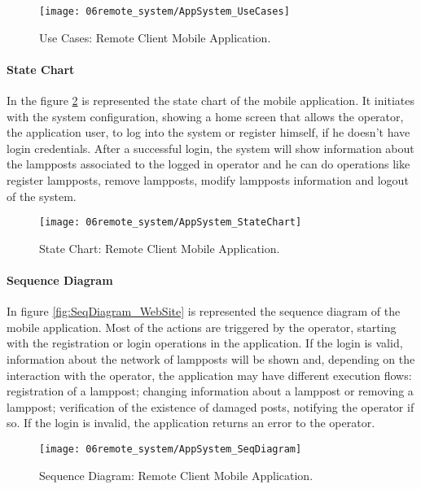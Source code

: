 \begin{figure}[H]
	\centering
	\texttt{[image: 06remote\_system/AppSystem\_UseCases]}
	\caption{Use Cases: Remote Client Mobile Application.}
	\label{fig:UseCases_application}
\end{figure}

\paragraph*{State Chart}
In the figure \ref{fig:StateChart_application} is represented the state chart of the mobile application. It initiates with the system configuration, showing a home screen that allows the operator, the application user, to log into the system or register himself, if he doesn’t have login credentials. After a successful login, the system will show information about the lampposts associated to the logged in operator and he can do operations like register lampposts, remove lampposts, modify lampposts information and logout of the system.

\begin{figure}[H]
	\centering
	\texttt{[image: 06remote\_system/AppSystem\_StateChart]}
	\caption{State Chart: Remote Client Mobile Application.}
	\label{fig:StateChart_application}
\end{figure}

\paragraph*{Sequence Diagram}
In figure \ref{fig:SeqDiagram_WebSite} is represented the sequence diagram of the mobile application. Most of the actions are triggered by the operator, starting with the registration or login operations in the application. If the login is valid, information about the network of lampposts will be shown and, depending on the interaction with the operator, the application may have different execution flows: registration of a lamppost; changing information about a lamppost or removing a lamppost; verification of the existence of damaged posts, notifying the operator if so. If the login is invalid, the application returns an error to the operator.

\begin{figure}[H]
	\centering
	\texttt{[image: 06remote\_system/AppSystem\_SeqDiagram]}
	\caption{Sequence Diagram: Remote Client Mobile Application.}
	\label{fig:SeqDiagram_application}
\end{figure}
